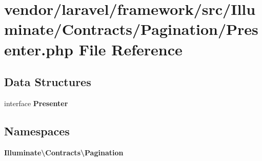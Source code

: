 \section{vendor/laravel/framework/src/\+Illuminate/\+Contracts/\+Pagination/\+Presenter.php File Reference}
\label{laravel_2framework_2src_2_illuminate_2_contracts_2_pagination_2_presenter_8php}
\subsection*{Data Structures}
\begin{DoxyCompactItemize}
\item 
interface {\bf Presenter}
\end{DoxyCompactItemize}
\subsection*{Namespaces}
\begin{DoxyCompactItemize}
\item 
 {\bf Illuminate\textbackslash{}\+Contracts\textbackslash{}\+Pagination}
\end{DoxyCompactItemize}
